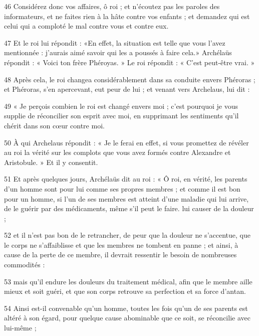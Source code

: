\par 46 Considérez donc vos affaires, ô roi ; et n'écoutez pas les paroles des informateurs, et ne faites rien à la hâte contre vos enfants ; et demandez qui est celui qui a comploté le mal contre vous et contre eux.

\par 47 Et le roi lui répondit : «En effet, la situation est telle que vous l'avez mentionnée : j'aurais aimé savoir qui les a poussés à faire cela.» Archélaüs répondit : « Voici ton frère Phéroyas. » Le roi répondit : « C'est peut-être vrai. »

\par 48 Après cela, le roi changea considérablement dans sa conduite envers Phéroras ; et Phéroras, s'en apercevant, eut peur de lui ; et venant vers Archelaus, lui dit :

\par 49 « Je perçois combien le roi est changé envers moi ; c'est pourquoi je vous supplie de réconcilier son esprit avec moi, en supprimant les sentiments qu'il chérit dans son cœur contre moi.

\par 50 À qui Archelaus répondit : « Je le ferai en effet, si vous promettez de révéler au roi la vérité sur les complots que vous avez formés contre Alexandre et Aristobule. » Et il y consentit.

\par 51 Et après quelques jours, Archélaüs dit au roi : « Ô roi, en vérité, les parents d'un homme sont pour lui comme ses propres membres ; et comme il est bon pour un homme, si l'un de ses membres est atteint d'une maladie qui lui arrive, de le guérir par des médicaments, même s'il peut le faire. lui causer de la douleur ;

\par 52 et il n'est pas bon de le retrancher, de peur que la douleur ne s'accentue, que le corps ne s'affaiblisse et que les membres ne tombent en panne ; et ainsi, à cause de la perte de ce membre, il devrait ressentir le besoin de nombreuses commodités :

\par 53 mais qu'il endure les douleurs du traitement médical, afin que le membre aille mieux et soit guéri, et que son corps retrouve sa perfection et sa force d'antan.

\par 54 Ainsi est-il convenable qu'un homme, toutes les fois qu'un de ses parents est altéré à son égard, pour quelque cause abominable que ce soit, se réconcilie avec lui-même ;

